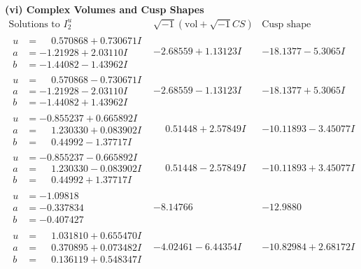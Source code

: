 \documentclass[1p]{elsarticle_modified}
\theoremstyle{definition}
\newcommand{\I}{\sqrt{-1}}
\begin{document}
\newpage\flushleft \textbf{(vi) Complex Volumes and Cusp Shapes}
$$\begin{array}{c|c|c}  
\text{Solutions to }I^u_{2}& \I (\text{vol} + \sqrt{-1}CS) & \text{Cusp shape}\\
 \hline 
\begin{aligned}
u &= \phantom{-}0.570868 + 0.730671 I \\
a &= -1.21928 + 2.03110 I \\
b &= -1.44082 - 1.43962 I\end{aligned}
 & -2.68559 + 1.13123 I & -18.1377 - 5.3065 I \\ \hline\begin{aligned}
u &= \phantom{-}0.570868 - 0.730671 I \\
a &= -1.21928 - 2.03110 I \\
b &= -1.44082 + 1.43962 I\end{aligned}
 & -2.68559 - 1.13123 I & -18.1377 + 5.3065 I \\ \hline\begin{aligned}
u &= -0.855237 + 0.665892 I \\
a &= \phantom{-}1.230330 + 0.083902 I \\
b &= \phantom{-}0.44992 - 1.37717 I\end{aligned}
 & \phantom{-}0.51448 + 2.57849 I & -10.11893 - 3.45077 I \\ \hline\begin{aligned}
u &= -0.855237 - 0.665892 I \\
a &= \phantom{-}1.230330 - 0.083902 I \\
b &= \phantom{-}0.44992 + 1.37717 I\end{aligned}
 & \phantom{-}0.51448 - 2.57849 I & -10.11893 + 3.45077 I \\ \hline\begin{aligned}
u &= -1.09818\phantom{ +0.000000I} \\
a &= -0.337834\phantom{ +0.000000I} \\
b &= -0.407427\phantom{ +0.000000I}\end{aligned}
 & -8.14766\phantom{ +0.000000I} & -12.9880\phantom{ +0.000000I} \\ \hline\begin{aligned}
u &= \phantom{-}1.031810 + 0.655470 I \\
a &= \phantom{-}0.370895 + 0.073482 I \\
b &= \phantom{-}0.136119 + 0.548347 I\end{aligned}
 & -4.02461 - 6.44354 I & -10.82984 + 2.68172 I \\ \hline\begin{aligned}

\end{aligned}
\end{array}$$
\end{document}
